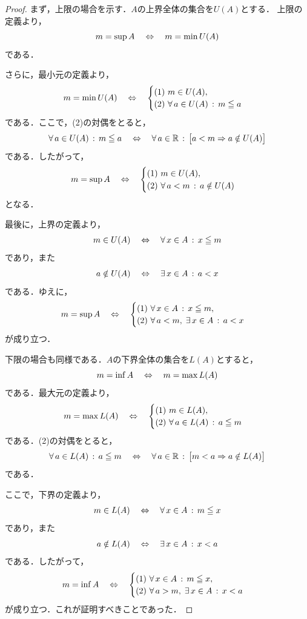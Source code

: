 \begin{tleftbar}
  \begin{proof}
    まず，上限の場合を示す．$A$の上界全体の集合を$U(A)$とする．
    上限の定義より，
    \[
      m = \sup A
      \quad\mathrel{\Leftrightarrow}\quad
      m = \min U(A)
    \]
    である．

    さらに，最小元の定義より，
    \[
      m = \min U(A)
      \quad\mathrel{\Leftrightarrow}\quad
      \begin{cases}
        \textup{(1)}\ m \in U(A),\\
        \textup{(2)}\ \forall\, a \in U(A) \,:\, m \leqq a
      \end{cases}
    \]
    である．ここで，(2)の対偶をとると，
    \[
      \forall\, a \in U(A) \,:\, m \leqq a
      \quad\mathrel{\Leftrightarrow}\quad
      \forall\, a \in \mathbb{R} \,:\, \bigl[ a < m \mathrel{\Rightarrow} a \notin U(A) \bigr]
    \]
    である．したがって，
    \[
      m = \sup A
      \quad\mathrel{\Leftrightarrow}\quad
      \begin{cases}
        \textup{(1)}\ m \in U(A),\\
        \textup{(2)}\ \forall\, a < m \,:\, a \notin U(A)
      \end{cases}
    \]
    となる．

    最後に，上界の定義より，
    \[
      m \in U(A)
      \quad\mathrel{\Leftrightarrow}\quad
      \forall\, x \in A \,:\, x \leqq m
    \]
    であり，また
    \[
      a \notin U(A)
      \quad\mathrel{\Leftrightarrow}\quad
      \exists\, x \in A \,:\, a < x
    \]
    である．ゆえに，
    \[
      m = \sup A
      \quad\mathrel{\Leftrightarrow}\quad
      \begin{cases}
        \textup{(1)}\ \forall\, x \in A \,:\, x \leqq m,\\
        \textup{(2)}\ \forall\, a < m ,\; \exists\, x \in A \,:\, a < x
      \end{cases}
    \]
    が成り立つ．

    下限の場合も同様である．$A$の下界全体の集合を$L(A)$とすると，
    \[
      m = \inf A
      \quad\mathrel{\Leftrightarrow}\quad
      m = \max L(A)
    \]
    である．最大元の定義より，
    \[
      m = \max L(A)
      \quad\mathrel{\Leftrightarrow}\quad
      \begin{cases}
        \textup{(1)}\ m \in L(A),\\
        \textup{(2)}\ \forall\, a \in L(A) \,:\, a \leqq m
      \end{cases}
    \]
    である．(2)の対偶をとると，
    \[
      \forall\, a \in L(A) \,:\, a \leqq m
      \quad\mathrel{\Leftrightarrow}\quad
      \forall\, a \in \mathbb{R} \,:\, \bigl[ m < a \mathrel{\Rightarrow} a \notin L(A) \bigr]
    \]
    である．

    ここで，下界の定義より，
    \[
      m \in L(A)
      \quad\mathrel{\Leftrightarrow}\quad
      \forall\, x \in A \,:\, m \leqq x
    \]
    であり，また
    \[
      a \notin L(A)
      \quad\mathrel{\Leftrightarrow}\quad
      \exists\, x \in A \,:\, x < a
    \]
    である．したがって，
    \[
      m = \inf A
      \quad\mathrel{\Leftrightarrow}\quad
      \begin{cases}
        \textup{(1)}\ \forall\, x \in A \,:\, m \leqq x,\\
        \textup{(2)}\ \forall\, a > m ,\; \exists\, x \in A \,:\, x < a
      \end{cases}
    \]
    が成り立つ．これが証明すべきことであった．
  \end{proof}
\end{tleftbar}


